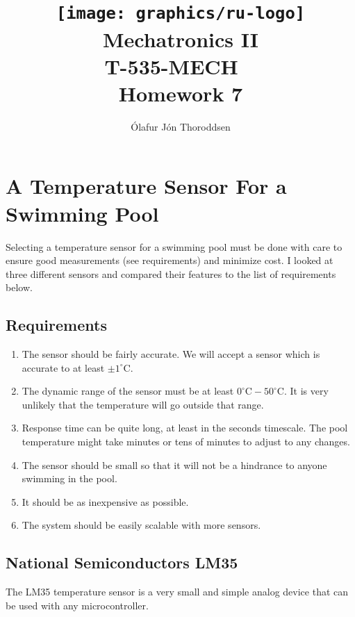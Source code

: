 \documentclass[11pt,a4paper,titlepage]{article}
\author{Ólafur Jón Thoroddsen}  %
\title{\texttt{[image: graphics/ru-logo]}\\\vspace{10mm}
	Mechatronics II\\T-535-MECH \ \\Homework 7}  %
\begin{document}
	\maketitle
	
	\tableofcontents
	\pagebreak
	
	\section{A Temperature Sensor For a Swimming Pool}
	
	Selecting a temperature sensor for a swimming pool must be done with care to ensure good measurements (see requirements) and minimize cost. I looked at three different sensors and compared their features to the list of requirements below.
	\subsection{Requirements\label{sec:requirements}}
	\begin{enumerate}
			\item\label{req:1}
			The sensor should be fairly accurate. We will accept a sensor which is accurate to at least $\pm 1^{\circ}\text{C}$.
			\item\label{req:2}
			The dynamic range of the sensor must be at least $0^{\circ}\text{C} - 50^{\circ}\text{C}$. It is very unlikely that the temperature will go outside that range.
			\item\label{req:3}
			Response time can be quite long, at least in the seconds timescale. The pool temperature might take minutes or tens of minutes to adjust to any changes. 
			\item\label{req:4}
			The sensor should be small so that it will not be a hindrance to anyone swimming in the pool.
			\item\label{req:5}
			It should be as inexpensive as possible.
			\item\label{req:6}
			The system should be easily scalable with more sensors.
	\end{enumerate}
	
	\subsection{National Semiconductors LM35\label{sec:lm35}}
	
	The LM35 temperature sensor is a very small and simple analog device that can be used with any microcontroller.
	
\end{document}
